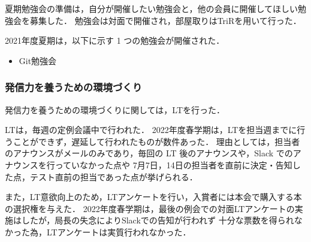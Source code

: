 夏期勉強会の準備は，自分が開催したい勉強会と，他の会員に開催してほしい勉強会を募集した．
勉強会は対面で開催され，部屋取りはTriRを用いて行った．

2021年度夏期は，以下に示す 1 つの勉強会が開催された．

\begin{itemize}
    \item Git勉強会
\end{itemize}


\subsubsection*{発信力を養うための環境づくり}
発信力を養うための環境づくりに関しては，LTを行った．

LTは，毎週の定例会議中で行われた．
2022年度春学期は，LTを担当週までに行うことができず，遅延して行われたものが数件あった．
理由としては，担当者のアナウンスがメールのみであり，毎回の LT 後のアナウンスや，Slack でのアナウンスを行っていなかった点や
7月7日，14日の担当者を直前に決定・告知した点，テスト直前の担当であった点が挙げられる．

また，LT意欲向上のため，LTアンケートを行い，入賞者には本会で購入する本の選択権を与えた．
2022年度春学期は，最後の例会での対面LTアンケートの実施はしたが，局長の失念によりSlackでの告知が行われず
十分な票数を得られなかった為，LTアンケートは実質行われなかった．
